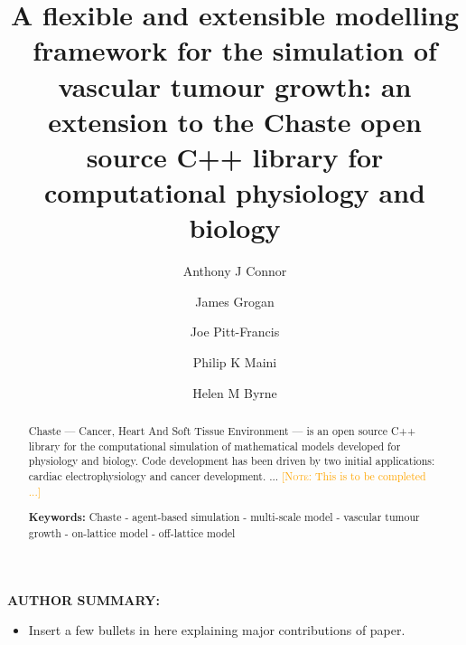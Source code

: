 \documentclass[superscriptaddress, a4paper]{article}
\newenvironment{authorsummary}
{\begin{framed} \begin{center} \begin{minipage}{0.9\textwidth} \noindent}
{\end{minipage} \end{center} \end{framed}}
\newcommand\NOTE[1]{\textcolor{orange}{[\textsc{Note:} {#1}]}}
\begin{document}
\title{A flexible and extensible modelling framework for the simulation of vascular tumour growth: an extension to the Chaste open source C++ library for computational physiology and biology}


\author[1,2]{Anthony J Connor}
\author[1]{James Grogan}
\author[2]{Joe Pitt-Francis}
\author[1]{Philip K Maini}
\author[1,2]{Helen M Byrne}
 
  
\date{}
  
\maketitle

\begin{abstract}
Chaste — Cancer, Heart And Soft Tissue Environment — is an open source C++ library for the computational simulation of mathematical models developed for physiology and biology. Code development has been driven by two initial applications: cardiac electrophysiology and cancer development. ... \NOTE{This is to be completed ...}

\smallskip
\noindent \textbf{Keywords:} Chaste - agent-based simulation - multi-scale model - vascular tumour growth - on-lattice model - off-lattice model

\end{abstract}

\vspace{1.5cm}

\begin{authorsummary}

\textbf{AUTHOR SUMMARY:}

\begin{itemize}
 \item Insert a few bullets in here explaining major contributions of paper.
\end{itemize}

\end{authorsummary}

\newpage

\setcounter{tocdepth}{3}
\tableofcontents


\newpage

\doublespacing
\end{document}
